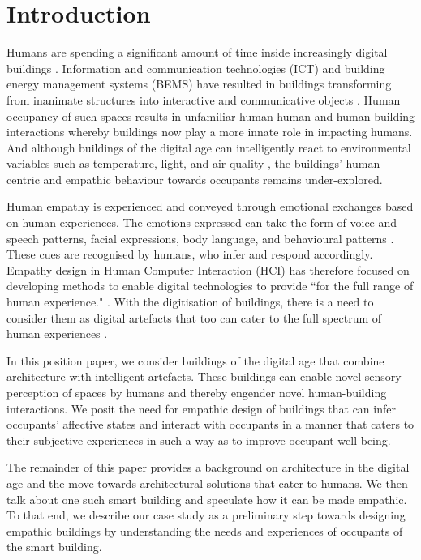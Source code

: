 \documentclass [sigconf, review, anonymous] {acmart}
\begin{document}
\section{Introduction}

Humans are spending a significant amount of time inside increasingly digital buildings \cite{alavi2016future}. Information and communication technologies (ICT) and building energy management systems (BEMS) have resulted in buildings transforming from inanimate structures into interactive and communicative objects \cite{nembrini2017human}. Human occupancy of such spaces results in unfamiliar human-human and human-building interactions whereby buildings now play a more innate role in impacting humans. And although buildings of the digital age can intelligently react to environmental variables such as temperature, light, and air quality \cite{bluyssen2009indoor, moreno2014user}, the buildings' human-centric and empathic behaviour towards occupants remains under-explored. 

Human empathy is experienced and conveyed through emotional exchanges based on human experiences. The emotions expressed can take the form of voice and speech patterns, facial expressions, body language, and behavioural patterns \cite{riess2017science}. These cues are recognised by humans, who infer and respond accordingly. Empathy design in Human Computer Interaction (HCI) has therefore focused on developing methods to enable digital technologies to provide ``for the full range of human experience." \cite{wright2008empathy}. With the digitisation of buildings, there is a need to consider them as digital artefacts that too can cater to the full spectrum of human experiences \cite{derix2014empathic}. 

In this position paper, we consider buildings of the digital age that combine architecture with intelligent artefacts. These buildings can enable novel sensory perception of spaces by humans and thereby engender novel human-building interactions. We posit the need for empathic design of buildings that can infer occupants' affective states and interact with occupants in a manner that caters to their subjective experiences in such a way as to improve occupant well-being. 

The remainder of this paper provides a background on architecture in the digital age and the move towards architectural solutions that cater to humans. We then talk about one such smart building and speculate how it can be made empathic. To that end, we describe our case study as a preliminary step towards designing empathic buildings by understanding the needs and experiences of occupants of the smart building. 
\end{document}
